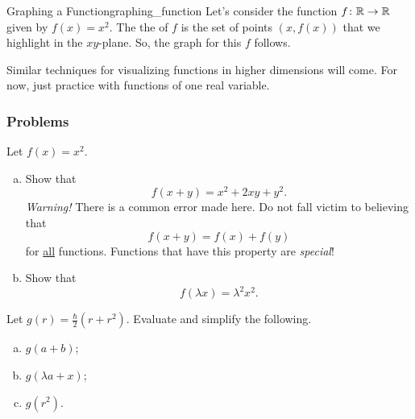     \begin{ex}{Graphing a Function}{graphing_function}
    Let's consider the function $f\colon \mathbb{R} \to \mathbb{R}$ given by $f(x)=x^2$.  The the  of $f$ is the set of points $(x,f(x))$ that we highlight in the $xy$-plane.  So, the graph for this $f$ follows.
    \begin{center}
    \end{center}
    \end{ex}
    
    Similar techniques for visualizing functions in higher dimensions will come. For now, just practice with functions of one real variable.
    
    \subsubsection{Problems}
    
    \begin{problem}
    Let $f(x)=x^2$. 
    \begin{enumerate}[(a)]
        \item Show that
        \[
        f(x+y)=x^2+2xy+y^2.
        \]
        \emph{Warning!} There is a common error made here. Do not fall victim to believing that
        \[
        f(x+y)=f(x)+f(y)
        \]
        for \underline{all} functions.  Functions that have this property are \emph{special}!
        \item Show that
        \[
        f(\lambda x)=\lambda^2x^2.
        \]
    \end{enumerate}
    \end{problem}
    
    \begin{problem}
    Let $g(r)=\frac{\hbar}{2}(r+r^2)$. Evaluate and simplify the following.
    \begin{enumerate}[(a)]
        \item $g(a+b)$;
        \item $g(\lambda a + x)$;
        \item $g(r^2)$.
    \end{enumerate}
    \end{problem}
    
